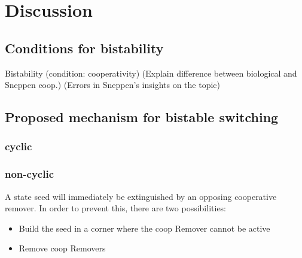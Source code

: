 \chapter{Discussion}
    \label{cha:discussion}
    \section{Conditions for bistability}
        \begin{itemize}
            {
                \color{red}
                \item Bistability (condition: cooperativity) (Explain difference between biological and Sneppen coop.) (Errors in Sneppen's insights on the topic)
            }
        \end{itemize}
    \section{Proposed mechanism for bistable switching}
        \subsection{cyclic}

        \subsection{non-cyclic}
            \begin{itemize}
                {
                    \color{red}
                    \item A state seed will immediately be extinguished by an opposing cooperative remover. In order to prevent this, there are two possibilities:
                        \begin{itemize}
                            \item Build the seed in a corner where the coop Remover cannot be active
                            \item Remove coop Removers
                        \end{itemize}
                }
            \end{itemize}
%
%
